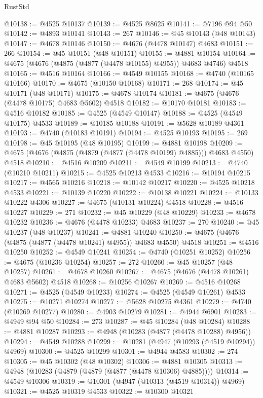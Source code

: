\begin{lexlean}{RustStd}
\begin{coremodule}
{\begin{coremodule}
{{{{{{{{{{{{{{{{{{{{{{{{{{{{{{{{{{{{{{{{{{{{{{{{{{{{{{{{{{{{@10138 := @4525 @10137
@10139 := @4525 @8625
@10141 := @7196 @94 @50
@10142 := @4893 @10141
@10143 := 267
@10146 := @45 @10143 (@48 @10143)
@10147 := @4678 @10146
@10150 := @4676 (@4478 @10147) @4683
@10151 := 266
@10154 := @45 @10151 (@48 @10151)
@10155 := @4881 @10154
@10164 := @4675 (@4676 (@4875 (@4877 (@4478 @10155) @4955)) @4683 @4746) @4518
@10165 := @4516 @10164
@10166 := @4549 @10155
@10168 := @4740 (@10165 @10166)
@10170 := @4675 (@10150 @10168)
@10171 := 268
@10174 := @45 @10171 (@48 @10171)
@10175 := @4678 @10174
@10181 := @4675 (@4676 (@4478 @10175) @4683 @5602) @4518
@10182 := @10170 @10181
@10183 := @4516 @10182
@10185 := @4525 (@4549 @10147)
@10188 := @4525 (@4549 @10175) @4533
@10189 := @10185 @10188
@10191 := @5628 @10189 @4361
@10193 := @4740 (@10183 @10191)
@10194 := @4525 @10193
@10195 := 269
@10198 := @45 @10195 (@48 @10195)
@10199 := @4881 @10198
@10209 := @4675 (@4676 (@4875 (@4879 (@4877 (@4478 @10199) @4885))) @4683 @4550) @4518
@10210 := @4516 @10209
@10211 := @4549 @10199
@10213 := @4740 (@10210 @10211)
@10215 := @4525 @10213 @4533
@10216 := @10194 @10215
@10217 := @4565 @10216
@10218 := @10142 @10217
@10220 := @4525 @10218 @4533
@10221 := @10139 @10220
@10222 := @10138 @10221
@10224 := @10133 @10222 @4306
@10227 := @4675 (@10131 @10224) @4518
@10228 := @4516 @10227
@10229 := 271
@10232 := @45 @10229 (@48 @10229)
@10233 := @4678 @10232
@10236 := @4676 (@4478 @10233) @4683
@10237 := 270
@10240 := @45 @10237 (@48 @10237)
@10241 := @4881 @10240
@10250 := @4675 (@4676 (@4875 (@4877 (@4478 @10241) @4955)) @4683 @4550) @4518
@10251 := @4516 @10250
@10252 := @4549 @10241
@10254 := @4740 (@10251 @10252)
@10256 := @4675 (@10236 @10254)
@10257 := 272
@10260 := @45 @10257 (@48 @10257)
@10261 := @4678 @10260
@10267 := @4675 (@4676 (@4478 @10261) @4683 @5602) @4518
@10268 := @10256 @10267
@10269 := @4516 @10268
@10271 := @4525 (@4549 @10233)
@10274 := @4525 (@4549 @10261) @4533
@10275 := @10271 @10274
@10277 := @5628 @10275 @4361
@10279 := @4740 (@10269 @10277)
@10280 := @4903 @10279
@10281 := @4944 @6901
@10283 := @4949 @94 @50
@10284 := 273
@10287 := @45 @10284 (@48 @10284)
@10288 := @4881 @10287
@10293 := @4948 (@10283 (@4877 (@4478 @10288) @4956))
@10294 := @4549 @10288
@10299 := @10281 (@4947 (@10293 (@4519 @10294)) @4969)
@10300 := @4525 @10299
@10301 := @4944 @4583
@10302 := 274
@10305 := @45 @10302 (@48 @10302)
@10306 := @4881 @10305
@10313 := @4948 (@10283 (@4879 (@4879 (@4877 (@4478 @10306) @4885))))
@10314 := @4549 @10306
@10319 := @10301 (@4947 (@10313 (@4519 @10314)) @4969)
@10321 := @4525 @10319 @4533
@10322 := @10300 @10321
}}}}}}}}}}}}}}}}}}}}}}}}}}}}}}}}}}}}}}}}}}}}}}}}}}}}}}}}}}}}
\end{coremodule}}
\end{coremodule}
\end{lexlean}
